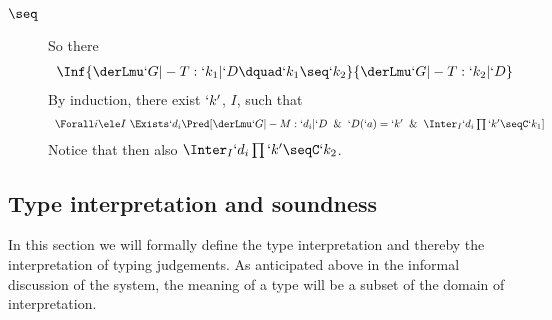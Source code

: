 \documentclass{CSML}
\begin{document}
\begin{Proof}
\begin{itemize}[label=$\Leftarrow$:]
\begin{description}
 \item[$\seq$]
So there 
 \[ \begin{array}{c}
\Inf	{\InfBox{ \derLmu `G |- T : `k_1 | `D } \dquad \InfBox{ `k_1 \seq `k_2 }
	}{\derLmu `G |- T : `k_2 | `D }
 \end{array} \]
By induction, there exist $`k'$, $I$, such that
 \[ \begin{array}{c}
\Forall i \ele I ~ \Exists `d_i \Pred[ \derLmuInt `G |- M : `d_i | `D \And `D(`a) = `k' \And \Inter_I `d_i\prod `k' \seqC `k_1 ] 
 \end{array} \]
Notice that then also $ \Inter_I `d_i\prod `k' \seqC `k_2 $. \qedhere

 \end{description}

\end{itemize}
 \end{Proof}
 
 
%


 \subsection{Type interpretation and soundness} \label{subsec:typeInterpretation}

In this section we will formally define the type interpretation and thereby the interpretation of typing judgements. 
As anticipated above in the informal discussion of the system, the meaning of a type will be a subset of the domain of interpretation. 
\end{document}
